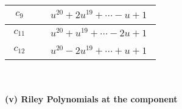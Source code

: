 \documentclass[1p]{elsarticle_modified}
\theoremstyle{definition}
\begin{document}
\begin{tabular}{m{50pt}|m{274pt}}
\hline $$\begin{aligned}c_{9}\end{aligned}$$&$\begin{aligned}
&u^{20}+2 u^{19}+\cdots- u+1
\end{aligned}$\\
\hline $$\begin{aligned}c_{11}\end{aligned}$$&$\begin{aligned}
&u^{20}+u^{19}+\cdots-2 u+1
\end{aligned}$\\
\hline $$\begin{aligned}c_{12}\end{aligned}$$&$\begin{aligned}
&u^{20}-2 u^{19}+\cdots+u+1
\end{aligned}$\\
\hline
\end{tabular}\\~\\
\newpage\renewcommand{\arraystretch}{1}
\flushleft \textbf{(v) Riley Polynomials at the component}\newline \\
\end{document}

